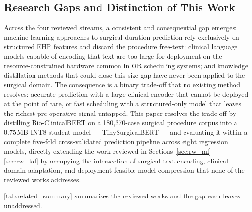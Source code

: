 \documentclass[3p]{elsarticle}
\begin{document}
\subsection*{Research Gaps and Distinction of This Work}

Across the four reviewed streams, a consistent and consequential gap emerges: machine learning approaches to surgical duration prediction rely exclusively on structured EHR features and discard the procedure free-text; clinical language models capable of encoding that text are too large for deployment on the resource-constrained hardware common in OR scheduling systems; and knowledge distillation methods that could close this size gap have never been applied to the surgical domain. The consequence is a binary trade-off that no existing method resolves: accurate prediction with a large clinical encoder that cannot be deployed at the point of care, or fast scheduling with a structured-only model that leaves the richest pre-operative signal untapped. This paper resolves the trade-off by distilling Bio-ClinicalBERT on a 180{,}370-case surgical procedure corpus into a 0.75\,MB INT8 student model — TinySurgicalBERT — and evaluating it within a complete five-fold cross-validated prediction pipeline across eight regression models, directly extending the work reviewed in Sections~\ref{sec:rw_ml}--\ref{sec:rw_kd} by occupying the intersection of surgical text encoding, clinical domain adaptation, and deployment-feasible model compression that none of the reviewed works addresses.

\cref{tab:related_summary} summarises the reviewed works and the gap each leaves unaddressed.
\end{document}
